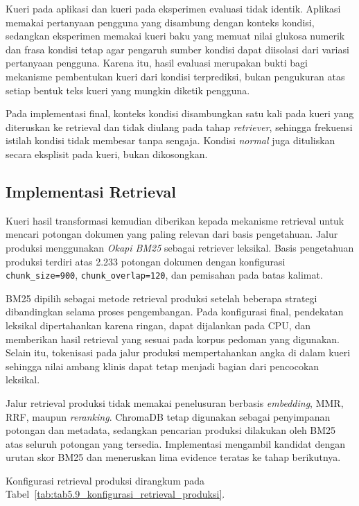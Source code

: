Kueri pada aplikasi dan kueri pada eksperimen evaluasi tidak identik. Aplikasi memakai pertanyaan pengguna yang disambung dengan konteks kondisi, sedangkan
eksperimen memakai kueri baku yang memuat nilai glukosa numerik dan frasa kondisi tetap agar pengaruh sumber kondisi dapat diisolasi dari variasi pertanyaan
pengguna. Karena itu, hasil evaluasi merupakan bukti bagi mekanisme pembentukan kueri dari kondisi terprediksi, bukan pengukuran atas setiap bentuk teks kueri
yang mungkin diketik pengguna.

Pada implementasi final, konteks kondisi disambungkan satu kali pada kueri yang diteruskan ke retrieval dan tidak diulang pada tahap \textit{retriever}, sehingga
frekuensi istilah kondisi tidak membesar tanpa sengaja. Kondisi \textit{normal} juga dituliskan secara eksplisit pada kueri, bukan dikosongkan.

\subsection{Implementasi Retrieval}
\label{subsec:bab5-implementasi-retrieval}

Kueri hasil transformasi kemudian diberikan kepada mekanisme retrieval untuk mencari potongan dokumen yang paling relevan dari basis pengetahuan. Jalur
produksi menggunakan \textit{Okapi BM25} sebagai retriever leksikal. Basis pengetahuan produksi terdiri atas 2.233 potongan dokumen dengan konfigurasi
\texttt{chunk\_size=900}, \texttt{chunk\_overlap=120}, dan pemisahan pada batas kalimat.

BM25 dipilih sebagai metode retrieval produksi setelah beberapa strategi dibandingkan selama proses pengembangan. Pada konfigurasi final, pendekatan leksikal
dipertahankan karena ringan, dapat dijalankan pada CPU, dan memberikan hasil retrieval yang sesuai pada korpus pedoman yang digunakan. Selain itu,
tokenisasi pada jalur produksi mempertahankan angka di dalam kueri sehingga nilai ambang klinis dapat tetap menjadi bagian dari pencocokan leksikal.

Jalur retrieval produksi tidak memakai penelusuran berbasis \textit{embedding}, MMR, RRF, maupun \textit{reranking}. ChromaDB tetap digunakan sebagai penyimpanan
potongan dan metadata, sedangkan pencarian produksi dilakukan oleh BM25 atas seluruh potongan yang tersedia. Implementasi mengambil kandidat dengan urutan
skor BM25 dan meneruskan lima evidence teratas ke tahap berikutnya.

Konfigurasi retrieval produksi dirangkum pada Tabel~\ref{tab:tab5.9_konfigurasi_retrieval_produksi}.

